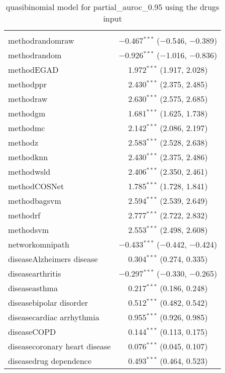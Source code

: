 
\begin{table}[!htbp] \centering 
  \caption{quasibinomial model for partial_auroc_0.95 using the drugs input} 
  \label{} 
\begin{tabular}{@{\extracolsep{5pt}}lc} 
\\[-1.8ex]\hline 
\hline \\[-1.8ex] 
 methodrandomraw & $-$0.467$^{***}$ ($-$0.546, $-$0.389) \\ 
  methodrandom & $-$0.926$^{***}$ ($-$1.016, $-$0.836) \\ 
  methodEGAD & 1.972$^{***}$ (1.917, 2.028) \\ 
  methodppr & 2.430$^{***}$ (2.375, 2.485) \\ 
  methodraw & 2.630$^{***}$ (2.575, 2.685) \\ 
  methodgm & 1.681$^{***}$ (1.625, 1.738) \\ 
  methodmc & 2.142$^{***}$ (2.086, 2.197) \\ 
  methodz & 2.583$^{***}$ (2.528, 2.638) \\ 
  methodknn & 2.430$^{***}$ (2.375, 2.486) \\ 
  methodwsld & 2.406$^{***}$ (2.350, 2.461) \\ 
  methodCOSNet & 1.785$^{***}$ (1.728, 1.841) \\ 
  methodbagsvm & 2.594$^{***}$ (2.539, 2.649) \\ 
  methodrf & 2.777$^{***}$ (2.722, 2.832) \\ 
  methodsvm & 2.553$^{***}$ (2.498, 2.608) \\ 
  networkomnipath & $-$0.433$^{***}$ ($-$0.442, $-$0.424) \\ 
  diseaseAlzheimers disease & 0.304$^{***}$ (0.274, 0.335) \\ 
  diseasearthritis & $-$0.297$^{***}$ ($-$0.330, $-$0.265) \\ 
  diseaseasthma & 0.217$^{***}$ (0.186, 0.248) \\ 
  diseasebipolar disorder & 0.512$^{***}$ (0.482, 0.542) \\ 
  diseasecardiac arrhythmia & 0.955$^{***}$ (0.926, 0.985) \\ 
  diseaseCOPD & 0.144$^{***}$ (0.113, 0.175) \\ 
  diseasecoronary heart disease & 0.076$^{***}$ (0.045, 0.107) \\ 
  diseasedrug dependence & 0.493$^{***}$ (0.464, 0.523) \\ 

\end{tabular}
\end{table}
